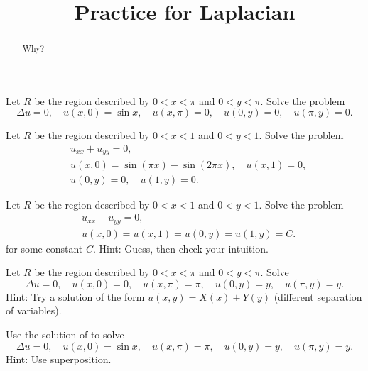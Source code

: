 \documentclass{ximera}
\title{Practice for Laplacian}
\begin{document}
\begin{abstract}
Why?
\end{abstract}
\maketitle


\begin{exercise}
    Let $R$ be the region described by $0 < x < \pi$ and $0 < y < \pi$. Solve the problem
    \begin{equation*}
        \Delta u = 0, \quad u(x,0) = \sin x, \quad u(x,\pi) = 0, \quad u(0,y) = 0,  \quad u(\pi,y) = 0 .
    \end{equation*}
\end{exercise}

\begin{exercise}
    Let $R$ be the region described by $0 < x < 1$ and $0 < y < 1$. Solve the problem
    \begin{align*}
        & u_{xx} + u_{yy} = 0, \\
        & u(x,0) = \sin (\pi x) - \sin (2\pi x), \quad u(x,1) = 0, \\
        & u(0,y) = 0, \quad u(1,y) = 0 .
    \end{align*}
\end{exercise}

\begin{exercise}
    Let $R$ be the region described by $0 < x < 1$ and $0 < y < 1$. Solve the problem
    \begin{align*}
        & u_{xx} + u_{yy} = 0, \\
        & u(x,0) = u(x,1) = u(0,y) = u(1,y) = C .
    \end{align*}
    for some constant $C$.  Hint: Guess, then check your intuition.
\end{exercise}

\begin{exercise} \label{dirich:diffsepexr}
    Let $R$ be the region described by $0 < x < \pi$ and $0 < y < \pi$. Solve
    \begin{equation*}
        \Delta u = 0, \quad u(x,0) = 0,\quad u(x,\pi) = \pi, \quad u(0,y) = y,\quad u(\pi,y) = y .
    \end{equation*}
    Hint: Try a solution of the form $u(x,y) = X(x) + Y(y)$ (different separation of variables).
\end{exercise}

\begin{exercise}
    Use the solution of  to solve
    \begin{equation*}
        \Delta u = 0, \quad u(x,0) = \sin x, \quad u(x,\pi) = \pi, \quad u(0,y) = y, \quad u(\pi,y) = y .
    \end{equation*}
    Hint: Use superposition.
\end{exercise}
\end{document}
